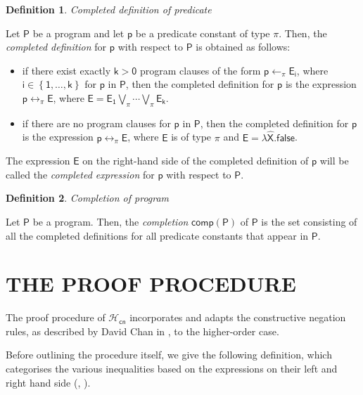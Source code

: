 \documentclass[inscr,ack,preface]{dithesis}
\theoremstyle{definition}
\newtheorem{definition}{Definition}[]
\newcommand{\hcn}{$\mathcal{H}_\mathsf{cn}$}
\newcommand{\msf}[1]{$\mathsf{#1}$}
\begin{document}
\begin{definition}{\emph{Completed definition of predicate}}\label{def:compdef}

Let \msf{P} be a program and let \msf{p} be a predicate constant of type $\pi$. Then, the \emph{completed definition} for \msf{p} with respect to \msf{P} is obtained as follows:
\begin{itemize}
  \item if there exist exactly \msf{k > 0} program clauses of the form \msf{p \leftarrow_{\pi} E_{i}}, where \msf{i \in \left\{ 1, \ldots, k \right\}} for \msf{p} in \msf{P}, then the completed definition for \msf{p} is the expression \msf{p \leftrightarrow_{\pi} E}, where \msf{E = E_1 \bigvee_{\pi} \cdots \bigvee_{\pi} E_k}.
  \item if there are no program clauses for \msf{p} in \msf{P}, then the completed definition for \msf{p} is the expression \msf{p \leftrightarrow_{\pi} E}, where \msf{E} is of type $\pi$ and \msf{E = \lambda \widehat{X}.false}.
\end{itemize}

The expression \msf{E} on the right-hand side of the completed definition of \msf{p} will be called the \emph{completed expression} for \msf{p} with respect to \msf{P}.
\end{definition}

\begin{definition}{\emph{Completion of program}}

Let \msf{P} be a program. Then, the \emph{completion} \msf{comp(P)} of \msf{P} is the set consisting of all the completed definitions for all predicate constants that appear in \msf{P}.
\end{definition}

\chapter{THE PROOF PROCEDURE}
\label{chap:proof}
The proof procedure of \hcn{} incorporates and adapts the constructive negation rules, as described by David Chan in \cite{DBLP:conf/slp/Chan89}, to the higher-order case.

Before outlining the procedure itself, we give the following definition, which categorises the various inequalities based on the expressions on their left and right hand side (\cite{DBLP:conf/iclp/Chan88}, \cite{DBLP:conf/kr/CharalambidisR14}).
\end{document}
